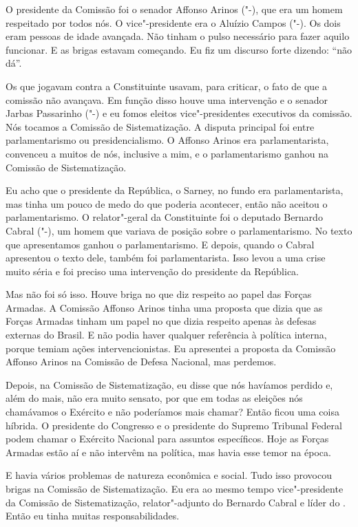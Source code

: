 O presidente da Comissão foi o senador Affonso Arinos
("-), que era um homem respeitado por todos nós. O vice"-presidente
era o Aluízio Campos ("-). Os dois eram pessoas de idade avançada.
Não tinham o pulso necessário para fazer aquilo funcionar. E as brigas
estavam começando. Eu fiz um discurso forte dizendo: ``não dá''.

Os que jogavam contra a Constituinte usavam, para criticar, o fato de
que a comissão não avançava. Em função disso houve uma intervenção e o
senador Jarbas Passarinho ("-) e eu fomos eleitos vice"-presidentes
executivos da comissão. Nós tocamos a Comissão de Sistematização. A
disputa principal foi entre parlamentarismo ou presidencialismo. O
Affonso Arinos era parlamentarista, convenceu a muitos de nós, inclusive
a mim, e o parlamentarismo ganhou na Comissão de Sistematização.

Eu acho que o presidente da República, o Sarney, no fundo era
parlamentarista, mas tinha um pouco de medo do que poderia acontecer,
então não aceitou o parlamentarismo. O relator"-geral da Constituinte foi
o deputado Bernardo Cabral ("-), um homem que variava de posição
sobre o parlamentarismo. No texto que apresentamos ganhou o
parlamentarismo. E depois, quando o Cabral apresentou o texto dele,
também foi parlamentarista. Isso levou a uma crise muito séria e foi
preciso uma intervenção do presidente da República.

Mas não foi só isso. Houve briga no que diz respeito ao papel das Forças
Armadas. A Comissão Affonso Arinos tinha uma proposta que dizia que as
Forças Armadas tinham um papel no que dizia respeito apenas às defesas
externas do Brasil. E não podia haver qualquer referência à política
interna, porque temiam ações intervencionistas. Eu apresentei a proposta
da Comissão Affonso Arinos na Comissão de Defesa Nacional, mas perdemos.

Depois, na Comissão de Sistematização, eu disse que nós havíamos perdido
e, além do mais, não era muito sensato, por que em todas as eleições nós
chamávamos o Exército e não poderíamos mais chamar? Então ficou uma
coisa híbrida. O presidente do Congresso e o presidente do Supremo
Tribunal Federal podem chamar o Exército Nacional para assuntos
específicos. Hoje as Forças Armadas estão aí e não intervêm na política,
mas havia esse temor na época.

E havia vários problemas de natureza econômica e social. Tudo isso
provocou brigas na Comissão de Sistematização. Eu era ao mesmo tempo
vice"-presidente da Comissão de Sistematização, relator"-adjunto do
Bernardo Cabral e líder do . Então eu tinha muitas
responsabilidades.

